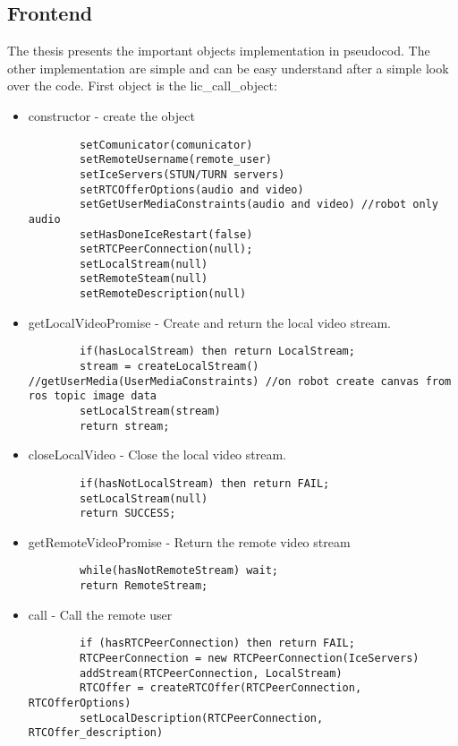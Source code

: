 \subsection{Frontend}
\label{sub-sec:implementation-callapp-frontend}
The thesis presents the important objects implementation in pseudocod. The other implementation are simple and can
be easy understand after a simple look over the code.
First object is the lic_call_object:
\begin{itemize}
    \item constructor - create the object
    \begin{lstlisting}
        setComunicator(comunicator)
        setRemoteUsername(remote_user)
        setIceServers(STUN/TURN servers)
        setRTCOfferOptions(audio and video)
        setGetUserMediaConstraints(audio and video) //robot only audio
        setHasDoneIceRestart(false)
        setRTCPeerConnection(null);
        setLocalStream(null)
        setRemoteSteam(null)
        setRemoteDescription(null)
    \end{lstlisting}
    \item getLocalVideoPromise - Create and return the local video stream.
    \begin{lstlisting}
        if(hasLocalStream) then return LocalStream;
        stream = createLocalStream() //getUserMedia(UserMediaConstraints) //on robot create canvas from ros topic image data
        setLocalStream(stream)
        return stream;
    \end{lstlisting}
    \item closeLocalVideo - Close the local video stream.
    \begin{lstlisting}
        if(hasNotLocalStream) then return FAIL;
        setLocalStream(null)
        return SUCCESS;
    \end{lstlisting}
    \item getRemoteVideoPromise - Return the remote video stream
    \begin{lstlisting}
        while(hasNotRemoteStream) wait;
        return RemoteStream;
    \end{lstlisting}
    \item call - Call the remote user
    \begin{lstlisting}
        if (hasRTCPeerConnection) then return FAIL;
        RTCPeerConnection = new RTCPeerConnection(IceServers)
        addStream(RTCPeerConnection, LocalStream)
        RTCOffer = createRTCOffer(RTCPeerConnection, RTCOfferOptions)
        setLocalDescription(RTCPeerConnection, RTCOffer_description)

\end{lstlisting}
\end{itemize}
